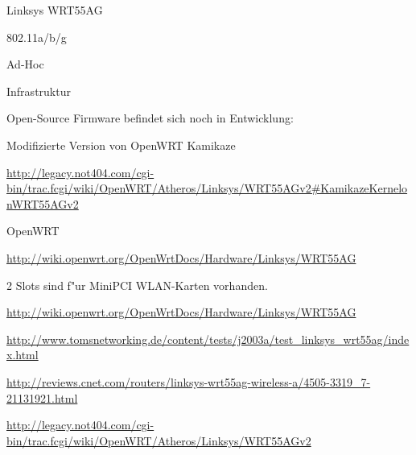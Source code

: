 %
%
\begin{wlandevice}{Linksys WRT55AG}


\begin{wlanieeestandard}
\item 802.11a/b/g
\end{wlanieeestandard}

\begin{wlanmode}
\item Ad-Hoc
\item Infrastruktur
\end{wlanmode}

\begin{wlanfirmware}
\item
Open-Source Firmware befindet sich noch in Entwicklung:

Modifizierte Version von OpenWRT Kamikaze

\url{http://legacy.not404.com/cgi-bin/trac.fcgi/wiki/OpenWRT/Atheros/Linksys/WRT55AGv2#KamikazeKernelonWRT55AGv2}

OpenWRT

\url{http://wiki.openwrt.org/OpenWrtDocs/Hardware/Linksys/WRT55AG}
\end{wlanfirmware}


\begin{wlanextrainfo}
\item
2 Slots sind f"ur MiniPCI WLAN-Karten vorhanden.
\end{wlanextrainfo}

\begin{wlanlink}
\item \url{http://wiki.openwrt.org/OpenWrtDocs/Hardware/Linksys/WRT55AG}
\item \url{http://www.tomsnetworking.de/content/tests/j2003a/test_linksys_wrt55ag/index.html}
\item \url{http://reviews.cnet.com/routers/linksys-wrt55ag-wireless-a/4505-3319_7-21131921.html}
\item \url{http://legacy.not404.com/cgi-bin/trac.fcgi/wiki/OpenWRT/Atheros/Linksys/WRT55AGv2}
\end{wlanlink}

\end{wlandevice}


